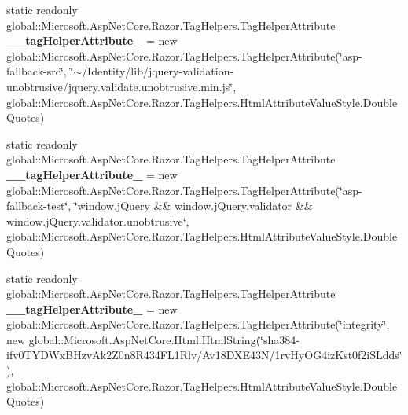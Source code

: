 \begin{DoxyCompactItemize}
\item 
\mbox{\label{class_projeto_e_s_w_1_1_areas_1_1_identity_1_1_pages_1_1_areas___identity___pages_____validation_scripts_partial_a28ce1eb659227c963a73dc8c8fc77962}} 
static readonly global\+::\+Microsoft.\+Asp\+Net\+Core.\+Razor.\+Tag\+Helpers.\+Tag\+Helper\+Attribute {\bfseries \+\_\+\+\_\+tag\+Helper\+Attribute\+\_} = new global\+::\+Microsoft.\+Asp\+Net\+Core.\+Razor.\+Tag\+Helpers.\+Tag\+Helper\+Attribute(\char`\"{}asp-\/fallback-\/src\char`\"{}, \char`\"{}$\sim$/Identity/lib/jquery-\/validation-\/unobtrusive/jquery.\+validate.\+unobtrusive.\+min.\+js\char`\"{}, global\+::\+Microsoft.\+Asp\+Net\+Core.\+Razor.\+Tag\+Helpers.\+Html\+Attribute\+Value\+Style.\+Double\+Quotes)
\item 
\mbox{\label{class_projeto_e_s_w_1_1_areas_1_1_identity_1_1_pages_1_1_areas___identity___pages_____validation_scripts_partial_a4956289aa3b04f36acf27edb8768e2d2}} 
static readonly global\+::\+Microsoft.\+Asp\+Net\+Core.\+Razor.\+Tag\+Helpers.\+Tag\+Helper\+Attribute {\bfseries \+\_\+\+\_\+tag\+Helper\+Attribute\+\_} = new global\+::\+Microsoft.\+Asp\+Net\+Core.\+Razor.\+Tag\+Helpers.\+Tag\+Helper\+Attribute(\char`\"{}asp-\/fallback-\/test\char`\"{}, \char`\"{}window.\+j\+Query \&\& window.\+j\+Query.\+validator \&\& window.\+j\+Query.\+validator.\+unobtrusive\char`\"{}, global\+::\+Microsoft.\+Asp\+Net\+Core.\+Razor.\+Tag\+Helpers.\+Html\+Attribute\+Value\+Style.\+Double\+Quotes)
\item 
\mbox{\label{class_projeto_e_s_w_1_1_areas_1_1_identity_1_1_pages_1_1_areas___identity___pages_____validation_scripts_partial_adc1d35446addecaf45fc37c29cac2a5c}} 
static readonly global\+::\+Microsoft.\+Asp\+Net\+Core.\+Razor.\+Tag\+Helpers.\+Tag\+Helper\+Attribute {\bfseries \+\_\+\+\_\+tag\+Helper\+Attribute\+\_} = new global\+::\+Microsoft.\+Asp\+Net\+Core.\+Razor.\+Tag\+Helpers.\+Tag\+Helper\+Attribute(\char`\"{}integrity\char`\"{}, new global\+::\+Microsoft.\+Asp\+Net\+Core.\+Html.\+Html\+String(\char`\"{}sha384-\/ifv0\+T\+Y\+D\+Wx\+B\+Hzv\+Ak2\+Z0n8\+R434\+F\+L1\+Rlv/Av18\+D\+X\+E43N/1rv\+Hy\+O\+G4iz\+Kst0f2i\+S\+Ldds\char`\"{}), global\+::\+Microsoft.\+Asp\+Net\+Core.\+Razor.\+Tag\+Helpers.\+Html\+Attribute\+Value\+Style.\+Double\+Quotes)

\end{DoxyCompactItemize}
